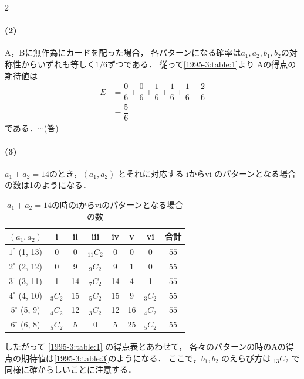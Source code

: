 \documentclass[../../main.tex]{subfiles}
\begin{document}
\begin{multicols}{2}
  \paragraph{(2)}
  A，Bに無作為にカードを配った場合， 各パターンになる確率は$a_1,a_2,b_1,b_2$の対称性からいずれも等しく$1/6$ずつである．
  従って\cref{1995-3:table:1}より
  Aの得点の期待値は
  \begin{align}
    E
    & = \dfrac{0}{6} + \dfrac{0}{6} + \dfrac{1}{6} + \dfrac{1}{6} + \dfrac{1}{6} + \dfrac{2}{6} \\
    & = \dfrac{5}{6}
  \end{align}
  である．$\cdots$(答)

  \paragraph{(3)}
  $a_1+a_2=14$のとき，$(a_1, a_2)$ とそれに対応する iからvi のパターンとなる場合の数は\cref{1995-3:table:2}のようになる．
  \begin{table}[H]
    \centering
    \caption{$a_1+a_2=14$の時のiからviのパターンとなる場合の数}
    \label{1995-3:table:2}
    \begin{tabular}{|c||c|c|c|c|c|c|c|}
      \hline
      $(a_1, a_2)$      & i         & ii & iii        & iv & v  & vi        & 合計   \\
      \hline
      $1^\circ$ (1, 13) & 0         & 0  & $_{11}C_2$ & 0  & 0  & 0         & $55$ \\
      \hline
      $2^\circ$ (2, 12) & 0         & 9  & $_{9}C_2$  & 9  & 1  & 0         & $55$ \\
      \hline
      $3^\circ$ (3, 11) & 1         & 14 & $_{7}C_2$  & 14 & 4  & 1         & $55$ \\
      \hline
      $4^\circ$ (4, 10) & $_{3}C_2$ & 15 & $_{5}C_2$  & 15 & 9  & $_{3}C_2$ & $55$ \\
      \hline
      $5^\circ$ (5, 9)  & $_{4}C_2$ & 12 & $_{3}C_2$  & 12 & 16 & $_{4}C_2$ & $55$ \\
      \hline
      $6^\circ$ (6, 8)  & $_{5}C_2$ & 5  & 0          & 5  & 25 & $_{5}C_2$ & $55$ \\
      \hline
    \end{tabular}
  \end{table}

  したがって \cref{1995-3:table:1} の得点表とあわせて，
  各々のパターンの時のAの得点の期待値は\cref{1995-3:table:3}のようになる．
  ここで，$b_1, b_2$ のえらび方は $_{13}C_2$ で同様に確からしいことに注意する．


\end{multicols}
\end{document}
